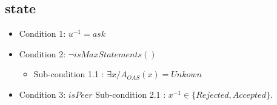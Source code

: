 \documentclass{article}
\begin{document}
	\subsection{state}
	\begin{itemize}
		\item Condition 1: $u^{-1} = ask$
		\item Condition 2:  $\neg isMaxStatements()$ 
		\begin{itemize}
			\item  Sub-condition 1.1 : $\exists x / A_{OAS} (x) = Unkown$
			
		\end{itemize}
		\item Condition 3: $isPeer$ 
		\subitem Sub-condition 2.1 : $x^{-1} \in \{Rejected, Accepted\}$.
	\end{itemize}
	
	
\end{document}
